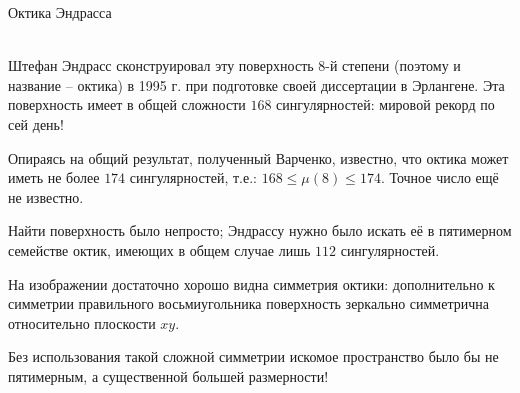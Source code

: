 \documentclass[ru]{./../../common/SurferDesc}%
\begin{document}
\footnotesize




\begin{surferPage}
  \begin{surferTitle}Октика Эндрасса\end{surferTitle} \\
Штефан Эндрасс сконструировал эту поверхность 8-й степени (поэтому и название – октика) в 1995 г. при подготовке своей диссертации в Эрлангене. Эта поверхность имеет в общей сложности $168$ сингулярностей: мировой рекорд по сей день!
  
     Опираясь на общий результат, полученный Варченко, известно, что октика может иметь не более $174$ сингулярностей, т.е.: $168 \le \mu(8) \le 174$. 
    Точное число ещё не известно.

     Найти поверхность было непросто; Эндрассу нужно было искать её в пятимерном семействе октик, имеющих в общем случае лишь $112$ сингулярностей.

На изображении достаточно хорошо видна симметрия октики: дополнительно к симметрии правильного восьмиугольника поверхность зеркально симметрична относительно плоскости $xy$.

Без использования такой сложной симметрии искомое пространство было бы не пятимерным, а существенной большей размерности!
  \begin{surferText}
     \end{surferText}
\end{surferPage}
\end{document}
